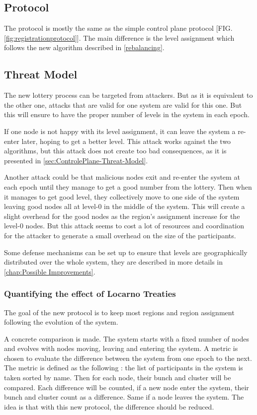 \documentclass[a4paper,11pt,oneside]{report}
\begin{document}
\subsection{Protocol}
The protocol is mostly the same as the simple control plane protocol [FIG.
\autoref{fig:registrationprotocol}]. The main difference is the level assignment
which follows the new algorithm described in \autoref{rebalancing}. 

\subsection{Threat Model}

The new lottery process can be targeted from attackers. But as it is equivalent
to the other one, attacks that are valid for one system are valid for this one.
But this will ensure to have the proper number of levels in the system in each
epoch.

If one node is not happy with its level assignment, it can leave the system a
re-enter later, hoping to get a better level. This attack works against the two
algorithms, but this attack does not create too
bad consequences, as it is presented in \autoref{sec:ControlePlane-Threat-Model}.

Another attack could be that malicious nodes exit and re-enter the system at
each epoch until they manage to get a good number from the lottery. Then when
it manages to get good level, they collectively move to one side of the system
leaving good nodes all at level-0 in the middle of the system. This will create
a slight overhead for the good nodes as the region’s assignment increase for
the level-0 nodes. But this attack seems to cost a lot of resources and
coordination for the attacker to generate a small overhead on the size of the
participants.

Some defense mechanisms can be set up to ensure that levels are geographically
distributed over the whole system, they are described in more details in
\autoref{chap:Possible Improvements}.

\subsubsection{Quantifying the effect of Locarno Treaties}
The goal of the new protocol is to keep most regions and region assignment
following the evolution of the system. 

A concrete comparison is made. The system starts with a fixed number of nodes
and evolves with nodes moving, leaving and entering the system. A metric is
chosen to evaluate the difference between the system from one epoch to the
next. The metric is defined as the following :  the list of participants in the
system is taken sorted by name. Then for each node, their bunch and cluster
will be compared. Each difference will be counted, if a new node enter the
system, their bunch and cluster count as a difference. Same if a node leaves
the system. The idea is that with this new protocol, the difference should be
reduced. 
\end{document}

